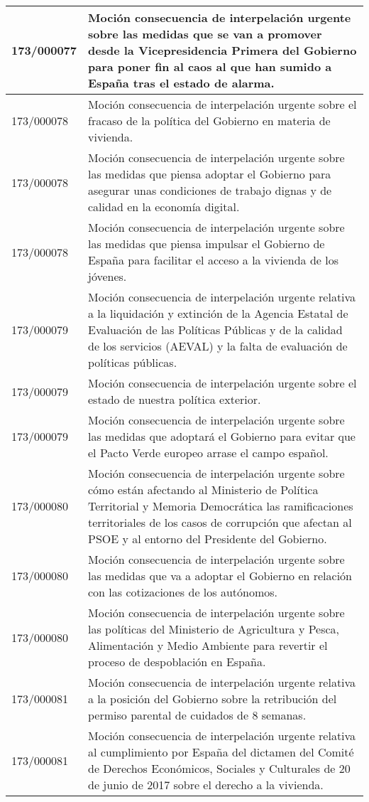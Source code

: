 {\begin{table}[H]
\begin{center}
\begin{tabularx}{\linewidth}{| l | X |}
\hline
173/000077 & Moción consecuencia de interpelación urgente sobre las medidas que se van a promover desde la Vicepresidencia Primera del Gobierno para poner fin al caos al que han sumido a España tras el estado de alarma. \\
\hline
173/000078 & Moción consecuencia de interpelación urgente sobre el fracaso de la política del Gobierno en materia de vivienda. \\
\hline
173/000078 & Moción consecuencia de interpelación urgente sobre las medidas que piensa adoptar el Gobierno para asegurar unas condiciones de trabajo dignas y de calidad en la economía digital. \\
\hline
173/000078 & Moción consecuencia de interpelación urgente sobre las medidas que piensa impulsar el Gobierno de España para facilitar el acceso a la vivienda de los jóvenes. \\
\hline
173/000079 & Moción consecuencia de interpelación urgente relativa a la liquidación y extinción de la Agencia Estatal de Evaluación de las Políticas Públicas y de la calidad de los servicios (AEVAL) y la falta de evaluación de políticas públicas. \\
\hline
173/000079 & Moción consecuencia de interpelación urgente sobre el estado de nuestra política exterior. \\
\hline
173/000079 & Moción consecuencia de interpelación urgente sobre las medidas que adoptará el Gobierno para evitar que el Pacto Verde europeo arrase el campo español. \\
\hline
173/000080 & Moción consecuencia de interpelación urgente sobre cómo están afectando al Ministerio de Política Territorial y Memoria Democrática las ramificaciones territoriales de los casos de corrupción que afectan al PSOE y al entorno del Presidente del Gobierno. \\
\hline
173/000080 & Moción consecuencia de interpelación urgente sobre las medidas que va a adoptar el Gobierno en relación con las cotizaciones de los autónomos. \\
\hline
173/000080 & Moción consecuencia de interpelación urgente sobre las políticas del Ministerio de Agricultura y Pesca, Alimentación y Medio Ambiente para revertir el proceso de despoblación en España. \\
\hline
173/000081 & Moción consecuencia de interpelación urgente relativa a la posición del Gobierno sobre la retribución del permiso parental de cuidados de 8 semanas. \\
\hline
173/000081 & Moción consecuencia de interpelación urgente relativa al cumplimiento por España del dictamen del Comité de Derechos Económicos, Sociales y Culturales de 20 de junio de 2017 sobre el derecho a la vivienda. \\

\end{tabularx}
\end{center}
\end{table}}

